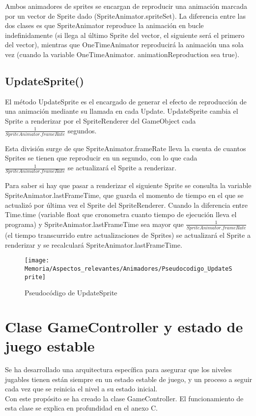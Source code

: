 Ambos animadores de sprites se encargan de reproducir una animación marcada por un vector de Sprite dado (SpriteAnimator.spriteSet). La diferencia entre las dos clases es que SpriteAnimator reproduce la animación en bucle indefinidamente (si llega al último Sprite del vector, el siguiente será el primero del vector), mientras que OneTimeAnimator reproducirá la animación una sola vez (cuando la variable OneTimeAnimator. animationReproduction sea true).

\subsection{UpdateSprite()}
El método UpdateSprite es el encargado de generar el efecto de reproducción de una animación mediante su llamada en cada Update. UpdateSprite cambia el Sprite a renderizar por el SpriteRenderer del GameObject cada $\frac{1}{SpriteAnimator.frameRate}$ segundos.

 
Esta división surge de que SpriteAnimator.frameRate lleva la cuenta de cuantos Sprites se tienen que reproducir en un segundo, con lo que cada $\frac{1}{SpriteAnimator.frameRate}$ se actualizará el Sprite a renderizar.

Para saber si hay que pasar a renderizar el siguiente Sprite se consulta la variable SpriteAnimator.lastFrameTime, que guarda el momento de tiempo en el que se actualizó por última vez el Sprite del SpriteRenderer. Cuando la diferencia entre Time.time (variable float que cronometra cuanto tiempo de ejecución lleva el programa) y SpriteAnimator.lastFrameTime sea mayor que $\frac{1}{SpriteAnimator.frameRate}$ (el tiempo transcurrido entre actualizaciones de Sprites) se actualizará el Sprite a renderizar y se recalculará SpriteAnimator.lastFrameTime.

\begin{figure}[h]
\texttt{[image: Memoria/Aspectos\_relevantes/Animadores/Pseudocodigo\_UpdateSprite]}
\caption{Pseudocódigo de UpdateSprite}
\end{figure}

\section{Clase GameController y estado de juego estable}
Se ha desarrollado una arquitectura específica para asegurar que los niveles jugables tienen están siempre en un estado estable de juego, y un proceso a seguir cada vez que se reinicia el nivel a su estado inicial.\\
Con este propósito se ha creado la clase GameController. El funcionamiento de esta clase se explica en profundidad en el anexo C.

